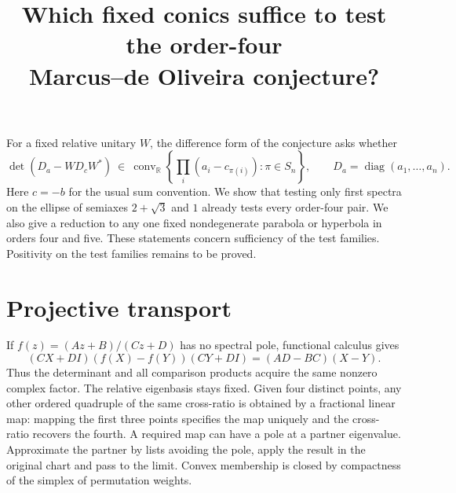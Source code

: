 \documentclass[11pt]{article}
\title{Which fixed conics suffice to test the order-four\\ Marcus--de Oliveira conjecture?}
\date{}
\author{}
\DeclareMathOperator{\diag}{diag}
\begin{document}
\maketitle
For a fixed relative unitary $W$, the difference form of the conjecture asks whether
\[
 \det(D_a-WD_cW^*)\ \in\
 \operatorname{conv}_{\mathbb R}\left\{\prod_i(a_i-c_{\pi(i)}):\pi\in S_n\right\},
 \qquad D_a=\diag(a_1,\ldots,a_n).
\]
Here $c=-b$ for the usual sum convention.
We show that testing only first spectra on the ellipse of semiaxes
$2+\sqrt3$ and $1$ already tests every order-four pair. We also give
a reduction to any one fixed nondegenerate parabola or hyperbola in
orders four and five. These statements concern sufficiency of the test
families. Positivity on the test families remains to be proved.

\section*{Projective transport}
If $f(z)=(Az+B)/(Cz+D)$ has no spectral pole, functional calculus gives
\[
 (CX+DI)(f(X)-f(Y))(CY+DI)=(AD-BC)(X-Y).
\]
Thus the determinant and all comparison products acquire the same nonzero
complex factor. The relative eigenbasis stays fixed. Given four distinct
points, any other ordered quadruple of the same cross-ratio is obtained
by a fractional linear map: mapping the first three points specifies the
map uniquely and the cross-ratio recovers the fourth. A required map can
have a pole at a partner eigenvalue. Approximate the partner by lists
avoiding the pole, apply the result in the original chart and pass to
the limit. Convex membership is closed by compactness of the simplex
of permutation weights.
\end{document}
